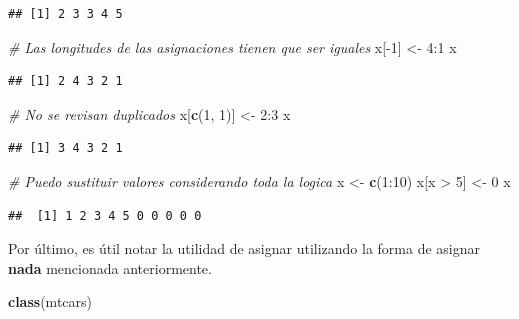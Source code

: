 \documentclass[]{article}
\newenvironment{Shaded}{\begin{snugshade}}{\end{snugshade}}
\newcommand{\KeywordTok}[1]{\textcolor[rgb]{0.13,0.29,0.53}{\textbf{{#1}}}}
\newcommand{\DecValTok}[1]{\textcolor[rgb]{0.00,0.00,0.81}{{#1}}}
\newcommand{\StringTok}[1]{\textcolor[rgb]{0.31,0.60,0.02}{{#1}}}
\newcommand{\CommentTok}[1]{\textcolor[rgb]{0.56,0.35,0.01}{\textit{{#1}}}}
\newcommand{\NormalTok}[1]{{#1}}
\begin{document}
\begin{verbatim}
## [1] 2 3 3 4 5
\end{verbatim}

\begin{Shaded}
\begin{Highlighting}[]
\CommentTok{# Las longitudes de las asignaciones tienen que ser iguales}
\NormalTok{x[-}\DecValTok{1}\NormalTok{] <-}\StringTok{ }\DecValTok{4}\NormalTok{:}\DecValTok{1}
\NormalTok{x}
\end{Highlighting}
\end{Shaded}

\begin{verbatim}
## [1] 2 4 3 2 1
\end{verbatim}

\begin{Shaded}
\begin{Highlighting}[]
\CommentTok{# No se revisan duplicados}
\NormalTok{x[}\KeywordTok{c}\NormalTok{(}\DecValTok{1}\NormalTok{, }\DecValTok{1}\NormalTok{)] <-}\StringTok{ }\DecValTok{2}\NormalTok{:}\DecValTok{3}
\NormalTok{x}
\end{Highlighting}
\end{Shaded}

\begin{verbatim}
## [1] 3 4 3 2 1
\end{verbatim}

\begin{Shaded}
\begin{Highlighting}[]
\CommentTok{# Puedo sustituir valores considerando toda la logica }
\NormalTok{x <-}\StringTok{ }\KeywordTok{c}\NormalTok{(}\DecValTok{1}\NormalTok{:}\DecValTok{10}\NormalTok{)}
\NormalTok{x[x >}\StringTok{ }\DecValTok{5}\NormalTok{] <-}\StringTok{ }\DecValTok{0}
\NormalTok{x}
\end{Highlighting}
\end{Shaded}

\begin{verbatim}
##  [1] 1 2 3 4 5 0 0 0 0 0
\end{verbatim}

Por último, es útil notar la utilidad de asignar utilizando la forma de
asignar \textbf{nada} mencionada anteriormente.

\begin{Shaded}
\begin{Highlighting}[]
\KeywordTok{class}\NormalTok{(mtcars)}
\end{Highlighting}
\end{Shaded}
\end{document}
